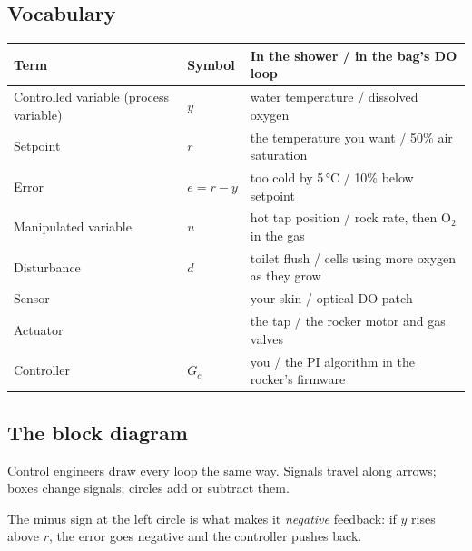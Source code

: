 \documentclass[11pt,a4paper]{article}
\begin{document}
\subsection{Vocabulary}
\begin{center}\small
\begin{tabularx}{\textwidth}{@{}l l X@{}}
\toprule
Term & Symbol & In the shower / in the bag's DO loop \\
\midrule
Controlled variable (process variable) & $y$ & water temperature / dissolved oxygen \\
Setpoint & $r$ & the temperature you want / 50\% air saturation \\
Error & $e = r - y$ & too cold by 5\,°C / 10\% below setpoint \\
Manipulated variable & $u$ & hot tap position / rock rate, then O$_2$ in the gas \\
Disturbance & $d$ & toilet flush / cells using more oxygen as they grow \\
Sensor & & your skin / optical DO patch \\
Actuator & & the tap / the rocker motor and gas valves \\
Controller & $G_c$ & you / the PI algorithm in the rocker's firmware \\
\bottomrule
\end{tabularx}
\end{center}

\subsection{The block diagram}
Control engineers draw every loop the same way. Signals travel along arrows; boxes change signals;
circles add or subtract them.
\begin{center}
\end{center}
The minus sign at the left circle is what makes it \emph{negative} feedback: if $y$ rises above $r$, the
error goes negative and the controller pushes back.
\end{document}
